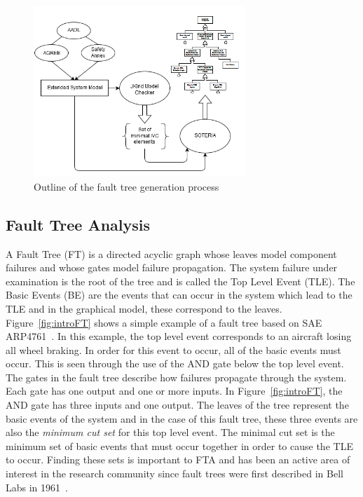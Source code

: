 \begin{figure}[h]
\begin{center}
\includegraphics[width=8cm]{images/processFTA.png}
\caption{Outline of the fault tree generation process} \label{fig:processFTA}
\end{center}
\end{figure}

\subsection{Fault Tree Analysis} A Fault Tree (FT) is a directed acyclic graph whose leaves model component failures and whose gates model failure propagation. The system failure under examination is the root of the tree and is called the Top Level Event (TLE). The Basic Events (BE) are the events that can occur in the system which lead to the TLE and in the graphical model, these correspond to the leaves. Figure~\ref{fig:introFT} shows a simple example of a fault tree based on SAE ARP4761~\cite{SAE:ARP4761}. In this example, the top level event corresponds to an aircraft losing all wheel braking. In order for this event to occur, all of the basic events must occur. This is seen through the use of the AND gate below the top level event. The gates in the fault tree describe how failures propagate through the system. Each gate has one output and one or more inputs. In Figure~\ref{fig:introFT}, the AND gate has three inputs and one output. The leaves of the tree represent the basic events of the system and in the case of this fault tree, these three events are also the \textit{minimum cut set} for this top level event. The minimal cut set is the minimum set of basic events that must occur together in order to cause the TLE to occur. Finding these sets is important to FTA and has been an active area of interest in the research community since fault trees were first described in Bell Labs in 1961~\cite{historyFTA}. 

